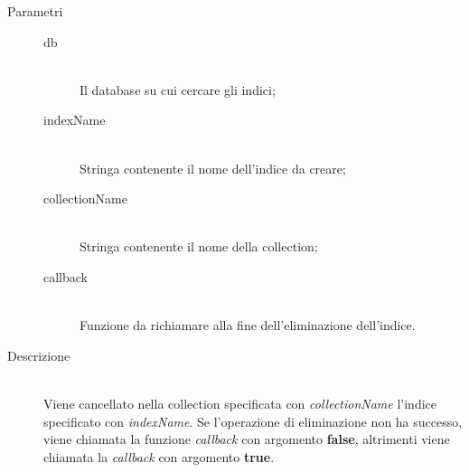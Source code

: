 \begin{description}
\begin{mldescription}
       \begin{description}
   	 \item[Parametri] \hfill
   	  \begin{description}
   	   \item[db] \hfill \\
   	   Il database su cui cercare gli indici;
   	   \item[indexName] \hfill \\
   	   Stringa contenente il nome dell'indice da creare;
   	   \item[collectionName] \hfill \\
   	   Stringa contenente il nome della collection;
   	   \item[callback] \hfill \\
   	   Funzione da richiamare alla fine dell'eliminazione dell'indice.
   	  \end{description}
   	 \item[Descrizione] \hfill \\
   	 Viene cancellato nella collection specificata con \textit{collectionName} l'indice specificato con \textit{indexName}. Se l'operazione di eliminazione non ha successo, viene chiamata la funzione \textit{callback} con argomento \textbf{false}, altrimenti viene chiamata la \textit{callback} con argomento \textbf{true}.  	 
   	\end{description} 
   	
  \end{mldescription}
\end{description}

